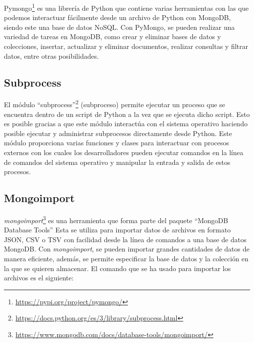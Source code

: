 \documentclass[a4paper, 12pt]{book}
\begin{document}
Pymongo\footnote{\url{https://pypi.org/project/pymongo/}} es una librería de Python que contiene varias herramientas con las que podemos interactuar fácilmente desde un archivo de Python con MongoDB, siendo este una base de datos NoSQL. 
Con PyMongo, se pueden realizar una variedad de tareas en MongoDB, como crear y eliminar bases de datos y colecciones, insertar, actualizar y eliminar documentos, realizar consultas y filtrar datos, entre otras posibilidades.


\subsection{Subprocess} %
\label{sec:subprocess} %
El módulo ``subprocess''\footnote{\url{https://docs.python.org/es/3/library/subprocess.html}} (subproceso) permite ejecutar un proceso que se encuentra dentro de un script de Python a la vez que se ejecuta dicho script.
Esto es posible gracias a que este módulo interactúa con el sistema operativo haciendo posible ejecutar y administrar subprocesos directamente desde Python. 
Este módulo proporciona varias funciones y clases para interactuar con procesos externos con los cuales los desarrolladores pueden ejecutar comandos en la línea de comandos del sistema operativo y manipular la entrada y salida de estos procesos.

\subsection{Mongoimport} %
\label{sec:mongoimport} %

\emph{mongoimport}\footnote{\url{https://www.mongodb.com/docs/database-tools/mongoimport/}} es una herramienta que forma parte del paquete ``MongoDB Database Tools''
Esta se utiliza para importar datos de archivos en formato JSON, CSV o TSV con facilidad desde la línea de comandos a una base de datos MongoDB. 
Con \emph{mongoimport}, se pueden importar grandes cantidades de datos de manera eficiente, además, se permite especificar la base de datos y la colección en la que se quieren almacenar.
El comando que se ha usado para importar los archivos es el siguiente:
\end{document}
